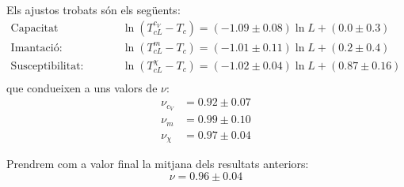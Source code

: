 \documentclass[a4paper]{article}
\begin{document}
Els ajustos trobats són els següents:
\begin{align*}
    \text{Capacitat calorífica:} &\quad \ln \left(T_{cL}^{c_V} - T_c\right) = (-1.09 \pm 0.08) \ln L + (0.0 \pm 0.3) \\
    \text{Imantació:} &\quad \ln \left(T_{cL}^{m} - T_c\right) = (-1.01 \pm 0.11) \ln L + (0.2 \pm 0.4) \\
    \text{Susceptibilitat:} &\quad \ln \left(T_{cL}^{\chi} - T_c\right) = (-1.02 \pm 0.04) \ln L + (0.87 \pm 0.16) \\
\end{align*}
que condueixen a uns valors de $\nu$:
\begin{align*}
	\nu_{c_V} &= 0.92 \pm 0.07 \\
	\nu_m &= 0.99 \pm 0.10 \\
	\nu_\chi &= 0.97 \pm 0.04
\end{align*}

Prendrem com a valor final la mitjana dels resultats anteriors:
\begin{equation} \label{nu}
    \nu = 0.96 \pm 0.04
\end{equation}
\end{document}
